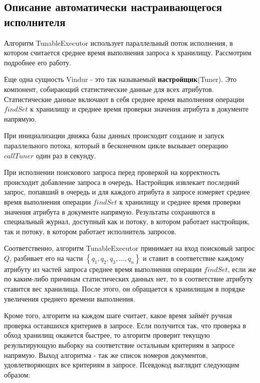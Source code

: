 \documentclass{matmex-diploma}
\begin{document}
    \subsection{Описание автоматически настраивающегося исполнителя}
        Алгоритм TunableExecutor использует параллельный поток исполнения, в котором считается среднее время выполнения запроса к хранилищу. Рассмотрим подробнее его работу.
        
        Еще одна сущность Vindur - это так называемый \textbf{настройщик}(Tuner). Это компонент, собирающий статистические данные для всех атрибутов. Статистические данные включают в себя среднее время выполнения операции $findSet$  к хранилищу и среднее время проверки значения атрибута в документе напрямую.
        
        При инициализации движка базы данных происходит создание и запуск параллельного потока, который в бесконечном цикле вызывает операцию $callTuner$ один раз в секунду.
        
        При исполнении поискового запроса перед проверкой на корректность происходит добавление запроса в очередь. Настройщик извлекает последний запрос, попавший в очередь и для каждого атрибута в запросе измеряет среднее время выполнения операции $findSet$  к хранилищу и среднее время проверки значения атрибута в документе напрямую. Результаты сохраняются в специальный журнал, доступный как и потоку, в котором работает настройщик, так и потоку, в котором работает исполнитель запросов.
        
        Соответственно, алгоритм TunableExecutor принимает на вход поисковый запрос $Q$, разбивает его на части $\left\{ q_1, q_2, q_3, ... , q_n \right\} $ и ставит в соответствие каждому атрибуту из частей запроса среднее время выполнения операции $findSet$, если же по каким-либо причинам статистических данных нет, то в соответствие атрибуту ставится вес хранилища. После этого, он обращается к хранилищам в порядке увеличения среднего времени выполнения. 
        
        Кроме того, алгоритм на каждом шаге считает, какое время займёт ручная проверка оставшихся критериев в запросе. Если получится так, что проверка в обход хранилищ окажется быстрее, то алгоритм проверит текущую результирующую выборку на соответствие остальным критериям в запросе напрямую. Выход алгоритма - так же список номеров документов, удовлетворяющих все критериям в запросе. Псевдокод выглядит следующим образом:
        
\end{document}
